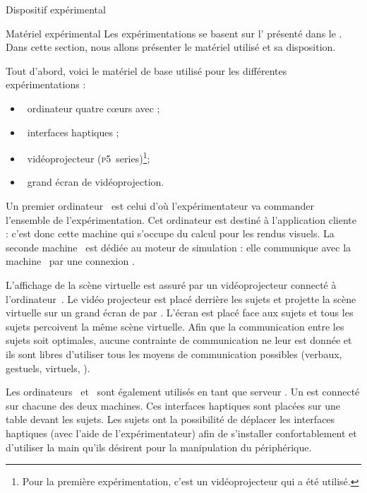 \documentclass[myfrancais,ngerman,english,french]{mythesis}
\begin{document}
	\begin{mychapter}{Dispositif expérimental}
		\begin{mysection}{Matériel expérimental}
			Les expérimentations se basent sur l' présenté dans le .
			Dans cette section, nous allons présenter le matériel utilisé et sa disposition.

			Tout d'abord, voici le matériel de base utilisé pour les différentes expérimentations :
			\begin{itemize}
				\item {}~ordinateur quatre cœurs \myIntelCore avec ;
				\item {}~interfaces haptiques \myOmni;
				\item {}~vidéoprojecteur \myACER (\textsc{p5}~series)\footnote{Pour la première expérimentation, c'est un vidéoprojecteur \myCasioXJ qui a été utilisé.};
				\item {}~grand écran de vidéoprojection.
			\end{itemize}

			Un premier ordinateur~ est celui d'où l'expérimentateur va commander l'ensemble de l'expérimentation.
			Cet ordinateur est destiné à l'application cliente  : c'est donc cette machine qui s'occupe du calcul pour les rendus visuels.
			La seconde machine~ est dédiée au moteur de simulation  : elle communique avec la machine~ par une connexion \myTCPIP.

			L'affichage de la scène virtuelle est assuré par un vidéoprojecteur connecté à l'ordinateur~.
			Le vidéo projecteur est placé derrière les sujets et projette la scène virtuelle sur un grand écran de  par .
			L'écran est placé face aux sujets et tous les sujets percoivent la même scène virtuelle.
			Afin que la communication entre les sujets soit optimales, aucune contrainte de communication ne leur est donnée et ils sont libres d'utiliser tous les moyens de communication possibles (verbaux, gestuels, virtuels, \myetc).

			Les ordinateurs~ et~ sont également utilisés en tant que serveur .
			Un \myOmni est connecté sur chacune des deux machines.
			Ces interfaces haptiques sont placées sur une table devant les sujets.
			Les sujets ont la possibilité de déplacer les interfaces haptiques (avec l'aide de l'expérimentateur) afin de s'installer confortablement et d'utiliser la main qu'ils désirent pour la manipulation du périphérique.


\end{mysection}
\end{mychapter}
\end{document}
